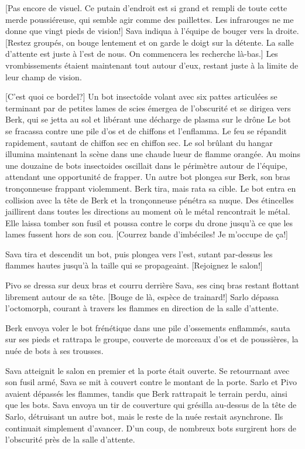 [Pas encore de visuel. Ce putain d'endroit est si grand et rempli de toute cette merde poussiéreuse, qui semble agir comme des paillettes. Les infrarouges ne me donne que vingt pieds de vision!] Sava indiqua à l'équipe de bouger vers la droite. [Restez groupés, on bouge lentement et on garde le doigt sur la détente. La salle d'attente est juste à l'est de nous. On commencera les recherche là-bas.] Les vrombissements étaient maintenant tout autour d'eux, restant juste à la limite de leur champ de vision. 

[C'est quoi ce bordel?] Un bot insectoîde volant avec six pattes articulées se terminant par de petites lames de scies émergea de l'obscurité et se dirigea vers Berk, qui se jetta au sol et libérant une décharge de plasma sur le drône Le bot se fracassa contre une pile d'os et de chiffons et l'enflamma. Le feu se répandit rapidement, sautant de chiffon sec en chiffon sec. Le sol brûlant du hangar illumina maintenant la scène dans une chaude lueur de flamme orangée. Au moins une douzaine de bots insectoides oscillait dans le périmètre autour de l'équipe, attendant une opportunité de frapper. Un autre bot plongea sur Berk, son bras tronçonneuse frappant violemment. Berk tira, mais rata sa cible. Le bot entra en collision avec la tête de Berk et la tronçonneuse pénétra sa nuque. Des étincelles jaillirent dans toutes les directions au moment où le métal rencontrait le métal. Elle laissa tomber son fusil et poussa contre le corps du drone jusqu'à ce que les lames fussent hors de son cou. [Courrez bande d'imbéciles! Je m'occupe de ça!] 

Sava tira et descendit un bot, puis plongea vers l'est, sutant par-dessus les flammes hautes jusqu'à la taille qui se propageaint. [Rejoignez le salon!] 

Pivo se dressa sur deux bras et courru derrière Sava, ses cinq bras restant flottant librement autour de sa tête. [Bouge de là, espèce de trainard!] Sarlo dépassa l'octomorph, courant à travers les flammes en direction de la salle d'attente. 

Berk envoya voler le bot frénétique dans une pile d'ossements enflammés, sauta sur ses pieds et rattrapa le groupe, couverte de morceaux d'os et de poussières, la nuée de bots à ses trousses. 

Sava atteignit le salon en premier et la porte était ouverte. Se retourrnant avec son fusil armé, Sava se mit à couvert contre le montant de la porte. Sarlo et Pivo avaient dépassés les flammes, tandis que Berk rattrapait le terrain perdu, ainsi que les bots. Sava envoya un tir de couverture qui grésilla au-dessus de la tête de Sarlo, détruisant un autre bot, mais le reste de la nuée restait asynchrone. Ils continuait simplement d'avancer. D'un coup, de nombreux bots surgirent hors de l'obscurité près de la salle d'attente. 

